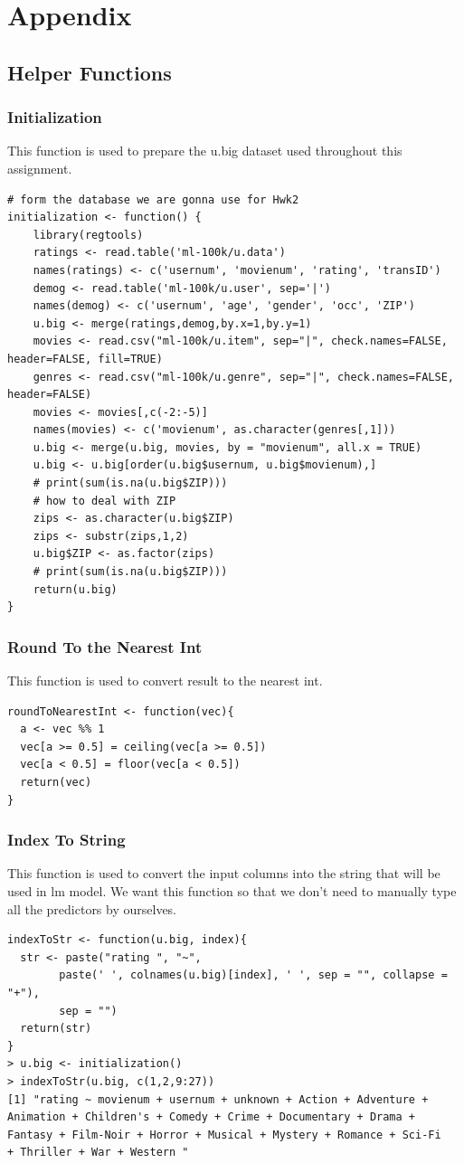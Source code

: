\documentclass[11pt]{article}
\begin{document}
\section{Appendix}
\subsection{Helper Functions}
\subsubsection{Initialization}
This function is used to prepare the u.big dataset used throughout
this assignment.
\begin{verbatim}
# form the database we are gonna use for Hwk2
initialization <- function() {
	library(regtools)
	ratings <- read.table('ml-100k/u.data')
	names(ratings) <- c('usernum', 'movienum', 'rating', 'transID')
	demog <- read.table('ml-100k/u.user', sep='|')
	names(demog) <- c('usernum', 'age', 'gender', 'occ', 'ZIP')
	u.big <- merge(ratings,demog,by.x=1,by.y=1)
	movies <- read.csv("ml-100k/u.item", sep="|", check.names=FALSE, header=FALSE, fill=TRUE)
	genres <- read.csv("ml-100k/u.genre", sep="|", check.names=FALSE, header=FALSE)
	movies <- movies[,c(-2:-5)]
	names(movies) <- c('movienum', as.character(genres[,1]))
	u.big <- merge(u.big, movies, by = "movienum", all.x = TRUE)
	u.big <- u.big[order(u.big$usernum, u.big$movienum),]
	# print(sum(is.na(u.big$ZIP)))
	# how to deal with ZIP
	zips <- as.character(u.big$ZIP)
	zips <- substr(zips,1,2)
	u.big$ZIP <- as.factor(zips)
	# print(sum(is.na(u.big$ZIP)))
	return(u.big)
}
\end{verbatim}
\subsubsection{Round To the Nearest Int}
This function is used to convert result to the nearest int.
\begin{verbatim}
roundToNearestInt <- function(vec){
  a <- vec %% 1
  vec[a >= 0.5] = ceiling(vec[a >= 0.5])
  vec[a < 0.5] = floor(vec[a < 0.5])
  return(vec)
}
\end{verbatim}
\subsubsection{Index To String}
This function is used to convert the input columns into the string
that will be used in lm model. We want this function so that we don't need to manually type all the predictors by ourselves.
\begin{verbatim}
indexToStr <- function(u.big, index){
  str <- paste("rating ", "~",
        paste(' ', colnames(u.big)[index], ' ', sep = "", collapse = "+"),
        sep = "")
  return(str)
}
> u.big <- initialization()
> indexToStr(u.big, c(1,2,9:27))
[1] "rating ~ movienum + usernum + unknown + Action + Adventure + 
Animation + Children's + Comedy + Crime + Documentary + Drama + 
Fantasy + Film-Noir + Horror + Musical + Mystery + Romance + Sci-Fi 
+ Thriller + War + Western "
\end{verbatim}
\end{document}
